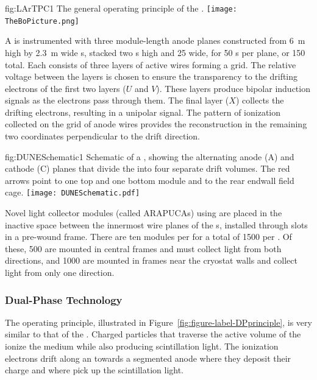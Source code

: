 \begin{dunefigure}{fig:LArTPC1}
{The general operating principle of the  .}
\texttt{[image: TheBoPicture.png]} 
\end{dunefigure}

A  is instrumented with three module-length anode planes constructed from \SI{6}{m} high by \SI{2.3}{m} wide s, stacked two s high and 25 wide, for 50 s per plane, or 150 total. Each  consists of three layers of active wires forming a grid. The relative voltage between the layers is chosen to ensure the transparency to the drifting electrons of the first two layers ($U$ and $V$). These layers produce bipolar induction signals as the electrons pass through them. The final layer ($X$) collects the drifting electrons, resulting in a unipolar signal. The pattern of ionization collected on the grid of anode wires provides the reconstruction in the remaining two coordinates perpendicular to the drift direction.

\begin{dunefigure}{fig:DUNESchematic1}
{Schematic of a \nominalmodsize {}  , showing the alternating anode (A) and cathode (C) planes that divide the  into four separate drift volumes. The red arrows point to one top and one bottom  module and to the rear endwall field cage.}
\texttt{[image: DUNESchematic.pdf]}
\end{dunefigure}

Novel  light collector modules (called ARAPUCAs) using  are placed in the inactive space between the innermost wire planes of the s, installed through slots in a pre-wound  frame. 
There are ten  modules per  for a total of \num{1500} per .  Of these, \num{500} are mounted in central  frames and must collect light from both directions, 
and \num{1000} are mounted in frames  near the %
cryostat walls and collect light from only one direction. 

\FloatBarrier
\subsubsection{Dual-Phase Technology}
\label{sec:fddp-exec-splar}

The  operating principle, illustrated in Figure~\ref{fig:figure-label-DPprinciple}, is very similar to that of the . %
 Charged particles that traverse the active volume of the  ionize the medium while also producing scintillation light.  The ionization electrons drift along an \efield towards a segmented anode where they deposit their charge and where   pick up the scintillation light. 

